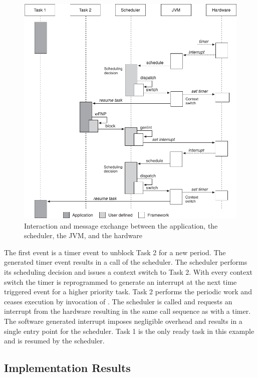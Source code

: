 \begin{figure}
    \centering
    \includegraphics[scale=\picscale]{runtime/rt_user_interaction}
    \caption[Interaction diagram of the scheduler framework]
    {Interaction and message exchange between the application,
the scheduler, the JVM, and the hardware}
    \label{fig_arch_rt_user_interaction}
\end{figure}

The first event is a timer event to unblock Task 2 for a new period.
The generated timer event results in a call of the scheduler. The
scheduler performs its scheduling decision and issues a context
switch to Task 2. With every context switch the timer is reprogrammed
to generate an interrupt at the next time triggered event for a
higher priority task. Task 2 performs the periodic work and ceases
execution by invocation of . The scheduler
is called and requests an interrupt from the hardware resulting in
the same call sequence as with a timer. The software generated
interrupt imposes negligible overhead and results in a single entry
point for the scheduler. Task 1 is the only ready task in this
example and is resumed by the scheduler.

\subsection{Implementation Results}

